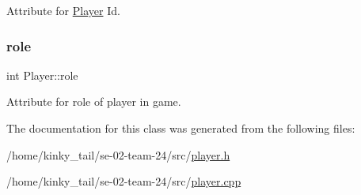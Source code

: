 Attribute for \hyperlink{class_player}{Player} Id. 

\mbox{\label{class_player_a3544f9c49c57c160a3edae988d1fae42}} 
\subsubsection{\texorpdfstring{role}{role}}
{\footnotesize\ttfamily int Player\+::role\hspace{0.3cm}{\ttfamily [private]}}



Attribute for role of player in game. 



The documentation for this class was generated from the following files\+:\begin{DoxyCompactItemize}
\item 
/home/kinky\+\_\+tail/se-\/02-\/team-\/24/src/\hyperlink{player_8h}{player.\+h}\item 
/home/kinky\+\_\+tail/se-\/02-\/team-\/24/src/\hyperlink{player_8cpp}{player.\+cpp}\end{DoxyCompactItemize}
